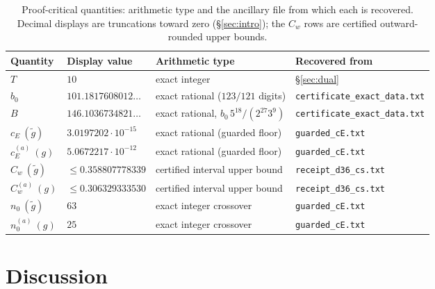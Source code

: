 \documentclass[11pt]{article}
\theoremstyle{remark}
\begin{document}
\begin{table}[htbp]
\centering\small
\begin{tabular}{@{}llll@{}}
\toprule
Quantity & Display value & Arithmetic type & Recovered from \\
\midrule
$T$ & $10$ & exact integer & \S\ref{sec:dual} \\
$b_0$ & $101.1817608012\ldots$ & exact rational ($123/121$ digits) & \texttt{certificate\_exact\_data.txt} \\
$B$ & $146.1036734821\ldots$ & exact rational, $b_0\,5^{18}/(2^{27}3^9)$ & \texttt{certificate\_exact\_data.txt} \\
$c_E\ (\tilde g)$ & $3.0197202\cdot10^{-15}$ & exact rational (guarded floor) & \texttt{guarded\_cE.txt} \\
$c_E^{(a)}\ (g)$ & $5.0672217\cdot10^{-12}$ & exact rational (guarded floor) & \texttt{guarded\_cE.txt} \\
$C_w\ (\tilde g)$ & $\le0.358807778339$ & certified interval upper bound & \texttt{receipt\_d36\_cs.txt} \\
$C_w^{(a)}\ (g)$ & $\le0.306329333530$ & certified interval upper bound & \texttt{receipt\_d36\_cs.txt} \\
$n_0\ (\tilde g)$ & $63$ & exact integer crossover & \texttt{guarded\_cE.txt} \\
$n_0^{(a)}\ (g)$ & $25$ & exact integer crossover & \texttt{guarded\_cE.txt} \\
\bottomrule
\end{tabular}
\caption{Proof-critical quantities: arithmetic type and the ancillary file
from which each is recovered. Decimal displays are truncations toward zero
(\S\ref{sec:intro}); the $C_w$ rows are certified outward-rounded upper
bounds.}
\label{tab:critical}
\end{table}

\section{Discussion}\label{sec:discussion}
\end{document}
